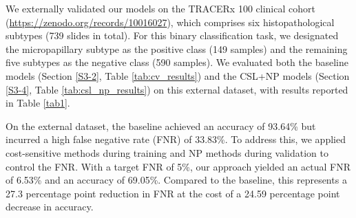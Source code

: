 \documentclass[journal,twoside,web]{ieeecolor}
\begin{document}
We externally validated our models on the TRACERx 100 clinical cohort (\url{https://zenodo.org/records/10016027}), which comprises six histopathological subtypes (739 slides in total). For this binary classification task, we designated the micropapillary subtype as the positive class (149 samples) and the remaining five subtypes as the negative class (590 samples). We evaluated both the baseline models (Section \ref{S3-2}, Table \ref{tab:cv_results}) and the CSL+NP models (Section \ref{S3-4}, Table \ref{tab:csl_np_results}) on this external dataset, with results reported in Table \ref{tab1}.

\begin{table}[htbp]
    \centering
    \caption{The prediction performance of Baseline and NP with CSL.}
    \label{tab1}
\end{table}

On the external dataset, the baseline achieved an accuracy of 93.64\% but incurred a high false negative rate (FNR) of 33.83\%. To address this, we applied cost-sensitive methods during training and NP methods during validation to control the FNR. With a target FNR of 5\%, our approach yielded an actual FNR of 6.53\% and an accuracy of 69.05\%. Compared to the baseline, this represents a 27.3 percentage point reduction in FNR at the cost of a 24.59 percentage point decrease in accuracy. 
\end{document}
